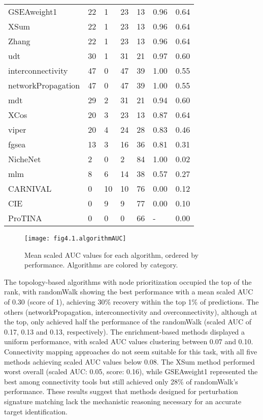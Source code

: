 \begin{table}[]
\begin{tabular}{lllllll}
GSEAweight1 & 22 & 1 & 23 & 13 & 0.96 & 0.64 \\
XSum & 22 & 1 & 23 & 13 & 0.96 & 0.64 \\
Zhang & 22 & 1 & 23 & 13 & 0.96 & 0.64 \\
udt & 30 & 1 & 31 & 21 & 0.97 & 0.60 \\
interconnectivity & 47 & 0 & 47 & 39 & 1.00 & 0.55 \\
networkPropagation & 47 & 0 & 47 & 39 & 1.00 & 0.55 \\
mdt & 29 & 2 & 31 & 21 & 0.94 & 0.60 \\
XCos & 20 & 3 & 23 & 13 & 0.87 & 0.64 \\
viper & 20 & 4 & 24 & 28 & 0.83 & 0.46 \\
fgsea & 13 & 3 & 16 & 36 & 0.81 & 0.31 \\
NicheNet & 2 & 0 & 2 & 84 & 1.00 & 0.02 \\
mlm & 8 & 6 & 14 & 38 & 0.57 & 0.27 \\
CARNIVAL & 0 & 10 & 10 & 76 & 0.00 & 0.12 \\
CIE & 0 & 9 & 9 & 77 & 0.00 & 0.10 \\
ProTINA & 0 & 0 & 0 & 66 & - & 0.00 \\ \hline
\end{tabular}
\end{table}

\begin{figure}[htbp]
    \centering
    \texttt{[image: fig4.1.algorithmAUC]}
    \caption[Mean scaled \gls{AUC} values for each algorithm.]{Mean scaled \gls{AUC} values for each algorithm, ordered by performance. Algorithms are colored by category.}
    \label{fig:fig4.1.algorithmAUC}
\end{figure}

The topology-based algorithms with node prioritization occupied the top of the rank, with randomWalk showing the best performance with a mean scaled \gls{AUC} of 0.30 (score of 1), achieving 30\% recovery within the top 1\% of predictions. The others (networkPropagation, interconnectivity and overconnectivity), although at the top, only achieved half the performance of the randomWalk (scaled \gls{AUC} of 0.17, 0.13 and 0.13, respectively). The enrichment-based methods displayed a uniform performance, with scaled \gls{AUC} values clustering between 0.07 and 0.10. Connectivity mapping approaches do not seem suitable for this task, with all five methods achieving scaled \gls{AUC} values below 0.08. The XSum method performed worst overall (scaled \gls{AUC}: 0.05, score: 0.16), while GSEAweight1 represented the best among connectivity tools but still achieved only 28\% of randomWalk's performance. These results suggest that methods designed for perturbation signature matching lack the mechanistic reasoning necessary for an accurate target identification.

